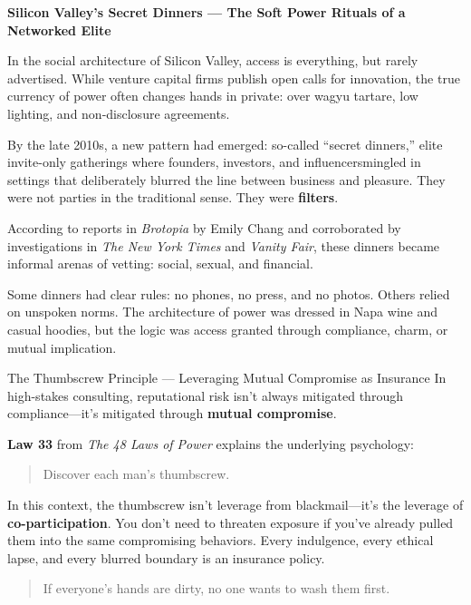 \medskip

\begin{HistoricalSidebar}{\textbf{Silicon Valley’s Secret Dinners --- The Soft Power Rituals of a Networked Elite}}

    In the social architecture of Silicon Valley, access is everything, but rarely advertised. While venture capital 
    firms publish open calls for innovation, the true currency of power often changes hands in private: over 
    wagyu tartare, low lighting, and non-disclosure agreements.

    \medskip
    
    By the late 2010s, a new pattern had emerged: so-called “secret dinners,” elite invite-only gatherings where 
    founders, investors, and influencersmingled in settings that deliberately blurred the 
    line between business and pleasure. They were not parties in the traditional sense. They were \textbf{filters}.

    \medskip
    
    According to reports in \textit{Brotopia} by Emily Chang and corroborated by investigations in 
    \textit{The New York Times} and \textit{Vanity Fair}, these dinners became informal arenas of 
    vetting: social, sexual, and financial.

    \medskip
    
    Some dinners had clear rules: no phones, no press, and no photos. Others relied on unspoken norms. 
    The architecture of power was dressed in Napa wine and casual hoodies, but the logic was access 
    granted through compliance, charm, or mutual implication.
    
\end{HistoricalSidebar}

    

\medskip


\begin{PhilosophicalSidebar}{The Thumbscrew Principle --- Leveraging Mutual Compromise as Insurance}
In high-stakes consulting, reputational risk isn’t always mitigated through compliance—it’s mitigated through 
\textbf{mutual compromise}.  

\medskip

\textbf{Law 33} from \textit{The 48 Laws of Power} explains the underlying psychology:  

\begin{quote}
Discover each man’s thumbscrew.
\end{quote}

In this context, the thumbscrew isn’t leverage from blackmail—it’s the leverage of \textbf{co-participation}. 
You don’t need to threaten exposure if you’ve already pulled them into the same compromising behaviors. Every 
indulgence, every ethical lapse, and every blurred boundary is an insurance policy.  

\begin{quote}
If everyone’s hands are dirty, no one wants to wash them first.
\end{quote}
\end{PhilosophicalSidebar}

